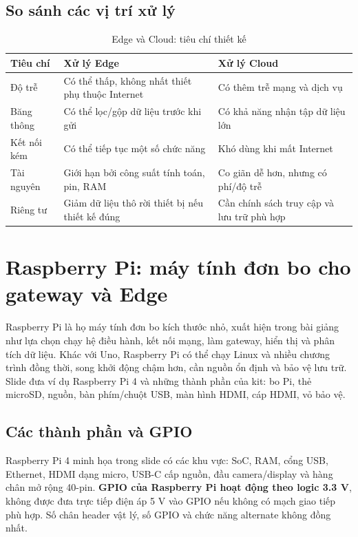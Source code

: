 \subsection{So sánh các vị trí xử lý}
\begin{table}[htbp]\centering\small
\caption{Edge và Cloud: tiêu chí thiết kế}
\begin{tabularx}{\textwidth}{p{27mm}XX}
\toprule
Tiêu chí & Xử lý Edge & Xử lý Cloud\\\midrule
Độ trễ & Có thể thấp, không nhất thiết phụ thuộc Internet & Có thêm trễ mạng và dịch vụ\\
Băng thông & Có thể lọc/gộp dữ liệu trước khi gửi & Có khả năng nhận tập dữ liệu lớn\\
Kết nối kém & Có thể tiếp tục một số chức năng & Khó dùng khi mất Internet\\
Tài nguyên & Giới hạn bởi công suất tính toán, pin, RAM & Co giãn dễ hơn, nhưng có phí/độ trễ\\
Riêng tư & Giảm dữ liệu thô rời thiết bị nếu thiết kế đúng & Cần chính sách truy cập và lưu trữ phù hợp\\\bottomrule
\end{tabularx}
\end{table}

\section{Raspberry Pi: máy tính đơn bo cho gateway và Edge}
Raspberry Pi là họ máy tính đơn bo kích thước nhỏ, xuất hiện trong bài giảng như lựa chọn chạy hệ điều hành, kết nối mạng, làm gateway, hiển thị và phân tích dữ liệu. Khác với Uno, Raspberry Pi có thể chạy Linux và nhiều chương trình đồng thời, song khởi động chậm hơn, cần nguồn ổn định và bảo vệ lưu trữ. Slide đưa ví dụ Raspberry Pi 4 và những thành phần của kit: bo Pi, thẻ microSD, nguồn, bàn phím/chuột USB, màn hình HDMI, cáp HDMI, vỏ bảo vệ.

\subsection{Các thành phần và GPIO}
Raspberry Pi 4 minh họa trong slide có các khu vực: SoC, RAM, cổng USB, Ethernet, HDMI dạng micro, USB-C cấp nguồn, đầu camera/display và hàng chân mở rộng 40-pin. \textbf{GPIO của Raspberry Pi hoạt động theo logic 3.3 V}, không được đưa trực tiếp điện áp 5 V vào GPIO nếu không có mạch giao tiếp phù hợp. Số chân header vật lý, số GPIO và chức năng alternate không đồng nhất.

